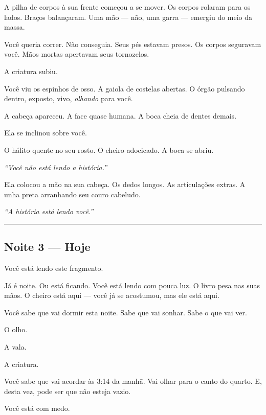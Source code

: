\noindent A pilha de corpos à sua frente começou a se mover. Os corpos rolaram para os lados. Braços balançaram. Uma mão --- não, uma garra --- emergiu do meio da massa.

\noindent Você queria correr. Não conseguia. Seus pés estavam presos. Os corpos seguravam você. Mãos mortas apertavam seus tornozelos.

\noindent A criatura subiu.

\noindent Você viu os espinhos de osso. A gaiola de costelas abertas. O órgão pulsando dentro, exposto, vivo, \textit{olhando} para você.

\noindent A cabeça apareceu. A face quase humana. A boca cheia de dentes demais.

\noindent Ela se inclinou sobre você.

\noindent O hálito quente no seu rosto. O cheiro adocicado. A boca se abriu.

\noindent \textit{\textquotedblleft{}Você não está lendo a história.\textquotedblright{}}

\noindent Ela colocou a mão na sua cabeça. Os dedos longos. As articulações extras. A unha preta arranhando seu couro cabeludo.

\noindent \textit{\textquotedblleft{}A história está lendo você.\textquotedblright{}}

\vspace{0.5em}\noindent\rule{\textwidth}{0.5pt}\vspace{0.5em}

\subsection*{Noite 3 --- Hoje}

\noindent Você está lendo este fragmento.

\noindent Já é noite. Ou está ficando. Você está lendo com pouca luz. O livro pesa nas suas mãos. O cheiro está aqui --- você já se acostumou, mas ele está aqui.

\noindent Você sabe que vai dormir esta noite. Sabe que vai sonhar. Sabe o que vai ver.

\noindent O olho.

\noindent A vala.

\noindent A criatura.

\noindent Você sabe que vai acordar às 3:14 da manhã. Vai olhar para o canto do quarto. E, desta vez, pode ser que não esteja vazio.

\noindent Você está com medo.


